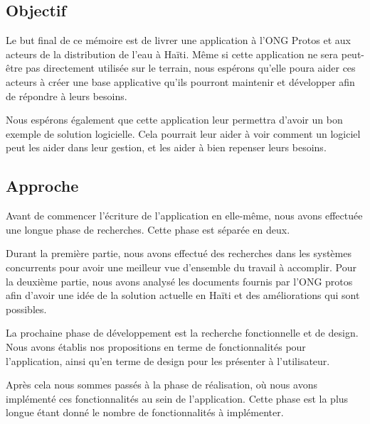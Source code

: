 \documentclass{eplmastersthesis_FR}
\begin{document}
		\subsection*{Objectif}

			Le but final de ce mémoire est de livrer une application à l'ONG Protos et aux acteurs de la distribution de l'eau à Haïti. Même si cette application ne sera peut-être pas directement utilisée sur le terrain, nous espérons qu'elle poura aider ces acteurs à créer une base applicative qu'ils pourront maintenir et développer afin de répondre à leurs besoins.

			Nous espérons également que cette application leur permettra d'avoir un bon exemple de solution logicielle. Cela pourrait leur aider à voir comment un logiciel peut les aider dans leur gestion, et les aider à bien repenser leurs besoins.


		\subsection*{Approche}

			Avant de commencer l'écriture de l'application en elle-même, nous avons effectuée une longue phase de recherches. Cette phase est séparée en deux.

			Durant la première partie, nous avons effectué des recherches dans les systèmes concurrents pour avoir une meilleur vue d'ensemble du travail à accomplir. Pour la deuxième partie, nous avons analysé les documents fournis par l'ONG protos afin d'avoir une idée de la solution actuelle en Haïti et des améliorations qui sont possibles.

			La prochaine phase de développement est la recherche fonctionnelle et de design. Nous avons établis nos propositions en terme de fonctionnalités pour l'application, ainsi qu'en terme de design pour les présenter à l'utilisateur.

			Après cela nous sommes passés à la phase de réalisation, où nous avons implémenté ces fonctionnalités au sein de l'application. Cette phase est la plus longue étant donné le nombre de fonctionnalités à implémenter.
\end{document}
